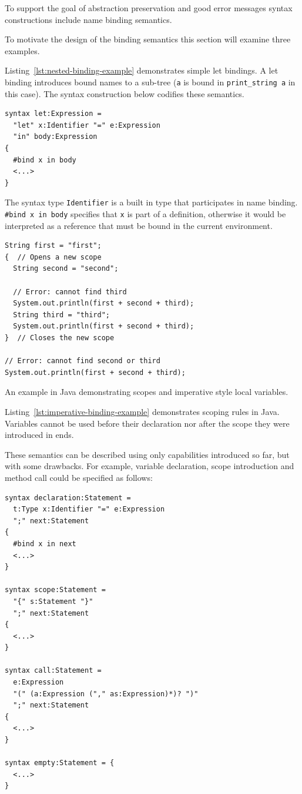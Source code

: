 \documentclass{kththesis}
\begin{document}
To support the goal of abstraction preservation and good error messages syntax constructions include name binding semantics.

To motivate the design of the binding semantics this section will examine three examples.

Listing~\ref{lst:nested-binding-example} demonstrates simple let bindings. A let binding introduces bound names to a sub-tree (\texttt{a} is bound in \texttt{print_string a} in this case). The syntax construction below codifies these semantics.

\begin{verbatim}
syntax let:Expression =
  "let" x:Identifier "=" e:Expression
  "in" body:Expression
{
  #bind x in body
  <...>
}
\end{verbatim}

The syntax type \texttt{Identifier} is a built in type that participates in name binding. \texttt{#bind x in body} specifies that \texttt{x} is part of a definition, otherwise it would be interpreted as a reference that must be bound in the current environment.

\begin{listing}[h]
\begin{verbatim}
String first = "first";
{  // Opens a new scope
  String second = "second";

  // Error: cannot find third
  System.out.println(first + second + third);
  String third = "third";
  System.out.println(first + second + third);
}  // Closes the new scope

// Error: cannot find second or third
System.out.println(first + second + third);
\end{verbatim}
\caption{An example in Java demonstrating scopes and imperative style local variables.}
\label{lst:imperative-binding-example}
\end{listing}

Listing~\ref{lst:imperative-binding-example} demonstrates scoping rules in Java. Variables cannot be used before their declaration nor after the scope they were introduced in ends.

These semantics can be described using only capabilities introduced so far, but with some drawbacks. For example, variable declaration, scope introduction and method call could be specified as follows:

\begin{verbatim}
syntax declaration:Statement =
  t:Type x:Identifier "=" e:Expression
  ";" next:Statement
{
  #bind x in next
  <...>
}

syntax scope:Statement =
  "{" s:Statement "}"
  ";" next:Statement
{
  <...>
}

syntax call:Statement =
  e:Expression
  "(" (a:Expression ("," as:Expression)*)? ")"
  ";" next:Statement
{
  <...>
}

syntax empty:Statement = {
  <...>
}
\end{verbatim}
\end{document}
